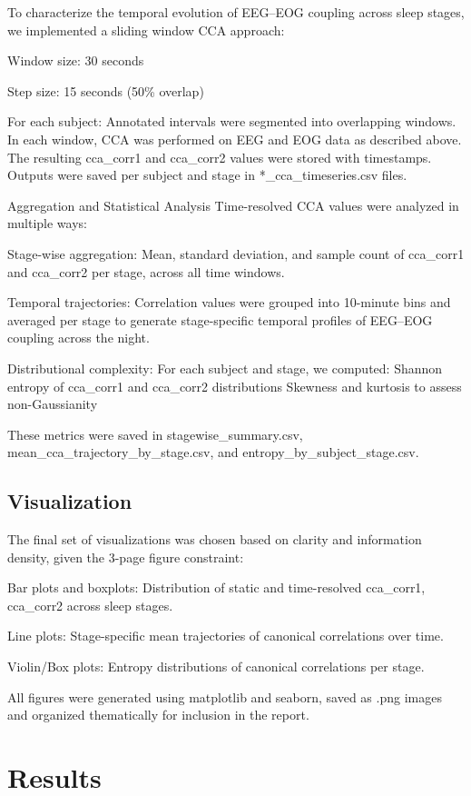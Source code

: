 To characterize the temporal evolution of EEG–EOG coupling across sleep stages, we implemented a sliding window CCA approach:

Window size: 30 seconds

Step size: 15 seconds (50\% overlap)

For each subject:
Annotated intervals were segmented into overlapping windows.
In each window, CCA was performed on EEG and EOG data as described above.
The resulting cca_corr1 and cca_corr2 values were stored with timestamps.
Outputs were saved per subject and stage in *_cca_timeseries.csv files.

Aggregation and Statistical Analysis
Time-resolved CCA values were analyzed in multiple ways:

Stage-wise aggregation:
Mean, standard deviation, and sample count of cca_corr1 and cca_corr2 per stage, across all time windows.

Temporal trajectories:
Correlation values were grouped into 10-minute bins and averaged per stage to generate stage-specific temporal profiles of EEG–EOG coupling across the night.

Distributional complexity:
For each subject and stage, we computed:
Shannon entropy of cca_corr1 and cca_corr2 distributions
Skewness and kurtosis to assess non-Gaussianity

These metrics were saved in stagewise_summary.csv, mean_cca_trajectory_by_stage.csv, and entropy_by_subject_stage.csv.

\subsection{Visualization}
The final set of visualizations was chosen based on clarity and information density, given the 3-page figure constraint:

Bar plots and boxplots:
Distribution of static and time-resolved cca_corr1, cca_corr2 across sleep stages.

Line plots:
Stage-specific mean trajectories of canonical correlations over time.

Violin/Box plots:
Entropy distributions of canonical correlations per stage.

All figures were generated using matplotlib and seaborn, saved as .png images and organized thematically for inclusion in the report.

\section{Results}

